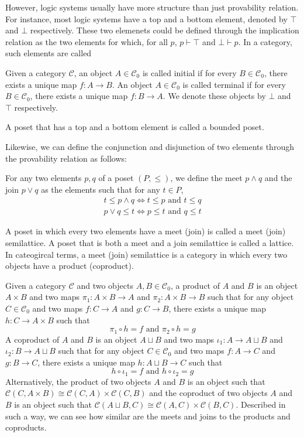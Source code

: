 However, logic systems usually have more structure than just provability relation.
For instance, most logic systems have a top and a bottom element, 
denoted by $\top$ and $\bot$ respectively.
These two elemenets could be defined through the implication relation as
the two elements for which, for all $p$, $p\vdash \top$ and $\bot\vdash p$.
In a category, such elements are called
\begin{definition}
    Given a category $\mathcal{C}$, an object $A\in\mathcal{C}_0$ is called initial if for every $B\in\mathcal{C}_0$,
    there exists a unique map $f:A\to B$.
    An object $A\in\mathcal{C}_0$ is called terminal if for every $B\in\mathcal{C}_0$,
    there exists a unique map $f:B\to A$.
    We denote these objects by $\bot$ and $\top$ respectively.
\end{definition}
A poset that has a top and a bottom element is called a bounded poset.

Likewise, we can define the conjunction and disjunction of two elements
through the provability relation as follows:
\begin{definition}
    For any two elements $p,q$ of a poset $(P,\leq)$, we define
    the meet $p\wedge q$ and the join $p\vee q$ as the elements such that for any $t\in P$,
    \begin{gather*}
        t\leq p\wedge q \iff t\leq p\text{ and }t\leq q\\
        p\vee q\leq t \iff p\leq t\text{ and }q\leq t
    \end{gather*}
\end{definition}
A poset in which every two elements have a meet (join) is called a meet (join) semilattice.
A poset that is both a meet and a join semilattice is called a lattice.
In cateogircal terms, a meet (join) semilattice is a category in which every two objects have a product (coproduct).

\begin{definition}
    Given a category $\mathcal{C}$ and two objects $A,B\in\mathcal{C}_0$,
    a product of $A$ and $B$ is an object $A\times B$ and two maps
    $\pi_1:A\times B\to A$ and $\pi_2:A\times B\to B$ such that for any object $C\in\mathcal{C}_0$
    and two maps $f:C\to A$ and $g:C\to B$, there exists a unique map $h:C\to A\times B$ such that
    \[
        \pi_1\circ h=f\text{ and }\pi_2\circ h=g
    \]
    A coproduct of $A$ and $B$ is an object $A\sqcup B$ and two maps
    $\iota_1:A\to A\sqcup B$ and $\iota_2:B\to A\sqcup B$ such that for any object $C\in\mathcal{C}_0$
    and two maps $f:A\to C$ and $g:B\to C$, there exists a unique map $h:A\sqcup B\to C$ such that
    \[
        h\circ \iota_1=f\text{ and }h\circ \iota_2=g
    \]
    Alternatively,
    the product of two objects $A$ and $B$ is an object such that
$\mathcal{C}(C,A\times B)\cong \mathcal{C}(C,A)\times \mathcal{C}(C,B)$
and the coproduct of two objects $A$ and $B$ is an object such that
$\mathcal{C}(A\sqcup B,C)\cong \mathcal{C}(A,C)\times \mathcal{C}(B,C)$.
Described in such a way, we can see how similar are the meets and joins to the products and coproducts.

\end{definition}

